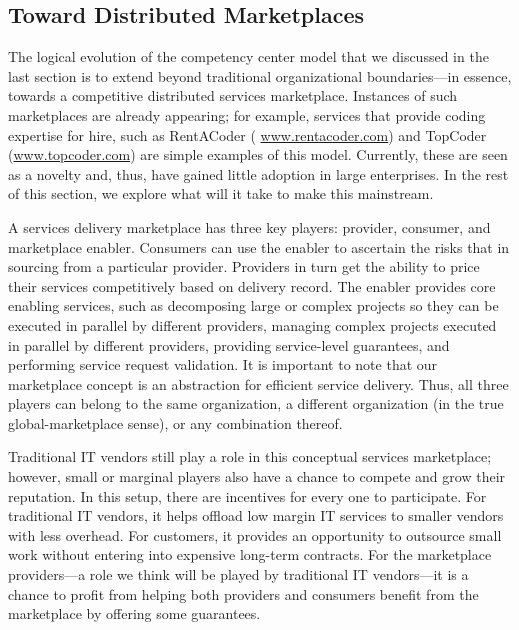 \begin{enumerate}
\end{enumerate}

\subsection{Toward Distributed Marketplaces}

The logical evolution of the competency center model that we discussed in the
last section is to extend beyond traditional organizational boundaries---in
essence, towards a competitive distributed services marketplace. Instances of
such marketplaces are already appearing; for example, services that provide
coding expertise for hire, such as RentACoder ({\small
  \url{www.rentacoder.com}}) and TopCoder ({\small \url{www.topcoder.com}}) are
simple examples of this model. Currently, these are seen as a novelty and, thus,
have gained little adoption in large enterprises. In the rest of this section,
we explore what will it take to make this mainstream.

A services delivery marketplace has three key players: provider, consumer, and
marketplace enabler. Consumers can use the enabler to ascertain the risks that
in sourcing from a particular provider. Providers in turn get the ability to
price their services competitively based on delivery record. The enabler
provides core enabling services, such as decomposing large or complex projects
so they can be executed in parallel by different providers, managing complex
projects executed in parallel by different providers, providing service-level
guarantees, and performing service request validation. It is important to note
that our marketplace concept is an abstraction for efficient service
delivery. Thus, all three players can belong to the same organization, a
different organization (in the true global-marketplace sense), or any
combination thereof.

Traditional IT vendors still play a role in this conceptual services
marketplace; however, small or marginal players also have a chance to compete
and grow their reputation. In this setup, there are incentives for every one to
participate. For traditional IT vendors, it helps offload low margin IT services
to smaller vendors with less overhead. For customers, it provides an opportunity
to outsource small work without entering into expensive long-term contracts. For
the marketplace providers---a role we think will be played by traditional IT
vendors---it is a chance to profit from helping both providers and consumers
benefit from the marketplace by offering some guarantees.

